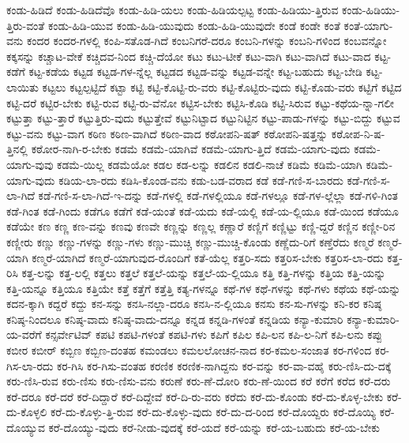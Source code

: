 {ಕಂಡು-ಹಿಡಿದೆ
ಕಂಡು-ಹಿಡಿದೆವೊ
ಕಂಡು-ಹಿಡಿ-ಯಲು
ಕಂಡು-ಹಿಡಿಯಲ್ಪಟ್ಟ
ಕಂಡು-ಹಿಡಿಯು-ತ್ತಿರುವ
ಕಂಡು-ಹಿಡಿಯು-ತ್ತಿರು-ವಂತೆ
ಕಂಡು-ಹಿಡಿ-ಯುವ
ಕಂಡು-ಹಿಡಿ-ಯುವುದು
ಕಂಡು-ಹಿಡಿ-ಯುವುದೇ
ಕಂಡೆ
ಕಂಡೇ
ಕಂತೆ
ಕಂತೆ-ಯಾಗು-ವನು
ಕಂದರ
ಕಂದರ-ಗಳಲ್ಲಿ
ಕಂಪಿ-ಸತೊಡ-ಗಿದೆ
ಕಂಬನಿಗರೆ-ದರೂ
ಕಂಬನಿ-ಗಳನ್ನು
ಕಂಬನಿ-ಗಳಿಂದ
ಕಂಬವನ್ನೋ
ಕಕ್ಕಸನ್ನು
ಕಚ್ಚಾಟ-ವೇಕೆ
ಕಚ್ಚಿದವ-ನಿಂದ
ಕಚ್ಚಿ-ದೆಯೋ
ಕಟು
ಕಟು-ಟೀಕೆ
ಕಟು-ವಾಗಿ
ಕಟು-ವಾಗಿದೆ
ಕಟು-ವಾದ
ಕಟ್ಟ-ಕಡೆಗೆ
ಕಟ್ಟ-ಕಡೆಯ
ಕಟ್ಟಡ
ಕಟ್ಟಡ-ಗಳ-ನ್ನೆಲ್ಲ
ಕಟ್ಟಡದ
ಕಟ್ಟಡ-ವನ್ನು
ಕಟ್ಟಡ-ವನ್ನೇ
ಕಟ್ಟ-ಬಹುದು
ಕಟ್ಟ-ಬೇಡಿ
ಕಟ್ಟ-ಲಾಯಿತು
ಕಟ್ಟಲು
ಕಟ್ಟಲ್ಪಟ್ಟಿದೆ
ಕಟ್ಟಾ
ಕಟ್ಟಿ
ಕಟ್ಟಿ-ಕೊಟ್ಟಿ-ರು-ವರು
ಕಟ್ಟಿ-ಕೊಟ್ಟಿರು-ವುದು
ಕಟ್ಟಿ-ಕೊಡು-ವರು
ಕಟ್ಟಿಗೆ
ಕಟ್ಟಿದ
ಕಟ್ಟಿ-ದರೆ
ಕಟ್ಟಿರ-ಬೇಕು
ಕಟ್ಟಿ-ರುವ
ಕಟ್ಟಿ-ರು-ವೆನೋ
ಕಟ್ಟಿಸ-ಬೇಕು
ಕಟ್ಟಿಸಿ-ಕೊಡಿ
ಕಟ್ಟಿ-ಸಿರುವ
ಕಟ್ಟು-ಕಥೆಯ-ನ್ನಾ-ಗಲೀ
ಕಟ್ಟುತ್ತಾ
ಕಟ್ಟು-ತ್ತಾರೆ
ಕಟ್ಟುತ್ತಿರು-ವುದು
ಕಟ್ಟುತ್ತೇವೆ
ಕಟ್ಟುನಿಟ್ಟಾದ
ಕಟ್ಟುನಿಟ್ಟಿನ
ಕಟ್ಟು-ಪಾಡು-ಗಳನ್ನು
ಕಟ್ಟು-ಬಿದ್ದು
ಕಟ್ಟುವ
ಕಟ್ಟು-ವನು
ಕಟ್ಟು-ವಾಗ
ಕಠಿಣ
ಕಠಿಣ-ವಾಗಿದೆ
ಕಠಿಣ-ವಾದ
ಕಠೋಪನಿ-ಷತ್
ಕಠೋಪನಿ-ಷತ್ತನ್ನು
ಕಠೋಪ-ನಿ-ಷ-ತ್ತಿನಲ್ಲಿ
ಕಠೋರ-ನಾಗಿ-ರ-ಬೇಕು
ಕಡಮೆ
ಕಡಮೆ-ಯಾಗಿವೆ
ಕಡಮೆ-ಯಾಗು-ತ್ತಿದೆ
ಕಡಮೆ-ಯಾಗು-ವುದು
ಕಡಮೆ-ಯಾಗು-ವುವು
ಕಡಮೆ-ಯಿಲ್ಲ
ಕಡಮೆಯೋ
ಕಡಲ
ಕಡ-ಲನ್ನು
ಕಡಲಿನ
ಕಡಲಿ-ನಾಚೆ
ಕಡಿಮೆ
ಕಡಿಮೆ-ಯಾಗಿ
ಕಡಿಮೆ-ಯಾಗು-ವುದು
ಕಡಿಯ-ಲಾ-ರದು
ಕಡಿಸಿ-ಕೊಂಡ-ವನು
ಕಡು-ಬಡ-ವರಾದ
ಕಡೆ
ಕಡೆ-ಗಣಿ-ಸ-ಬಾರದು
ಕಡೆ-ಗಣಿ-ಸ-ಲಾ-ಗಿದೆ
ಕಡೆ-ಗಣಿ-ಸ-ಲಾ-ಗಿದೆ-ಇ-ದನ್ನು
ಕಡೆ-ಗಳಲ್ಲಿ
ಕಡೆ-ಗಳಲ್ಲಿಯೂ
ಕಡೆ-ಗಳಲ್ಲೂ
ಕಡೆ-ಗಳ-ಲ್ಲೆಲ್ಲಾ
ಕಡೆ-ಗಳಿ-ಗಿಂತ
ಕಡೆ-ಗಿಂತ
ಕಡೆ-ಗಿಂದು
ಕಡೆಗೂ
ಕಡೆಗೆ
ಕಡೆ-ಯಂತೆ
ಕಡೆ-ಯದು
ಕಡೆ-ಯಲ್ಲಿ
ಕಡೆ-ಯ-ಲ್ಲಿಯೂ
ಕಡೆ-ಯಿಂದ
ಕಡೆಯೂ
ಕಡೆಯೇ
ಕಣ
ಕಣ್ಣ
ಕಣ-ವನ್ನು
ಕಣವು
ಕಣವೇ
ಕಣ್ಣನ್ನು
ಕಣ್ಣಲ್ಲ
ಕಣ್ಣಾರೆ
ಕಣ್ಣಿಗೆ
ಕಣ್ಣಿಟ್ಟು
ಕಣ್ಣಿ-ದ್ದರೆ
ಕಣ್ಣಿನ
ಕಣ್ಣೀ-ರಿನ
ಕಣ್ಣೀರು
ಕಣ್ಣು
ಕಣ್ಣು-ಗಳನ್ನು
ಕಣ್ಣು-ಗಳು
ಕಣ್ಣು-ಮುಚ್ಚಿ
ಕಣ್ಣು-ಮುಚ್ಚಿ-ಕೊಂಡು
ಕಣ್ಣೆದು-ರಿಗೆ
ಕಣ್ತೆರೆದು
ಕಣ್ಮರೆ
ಕಣ್ಮರೆ-ಯಾಗಿ
ಕಣ್ಮರೆ-ಯಾಗಿದೆ
ಕಣ್ಮರೆ-ಯಾಗುವುದ-ರೊಂದಿಗೆ
ಕತೆ-ಯೆಲ್ಲ
ಕತ್ತರಿ-ಸದು
ಕತ್ತರಿಸ-ಬೇಕು
ಕತ್ತರಿಸ-ಲಾ-ರದು
ಕತ್ತ-ರಿಸಿ
ಕತ್ತ-ಲನ್ನು
ಕತ್ತ-ಲಲ್ಲಿ
ಕತ್ತಲು
ಕತ್ತಲೆ
ಕತ್ತಲೆ-ಯನ್ನು
ಕತ್ತಲೆ-ಯ-ಲ್ಲಿಯೂ
ಕತ್ತಿ
ಕತ್ತಿ-ಗಳನ್ನು
ಕತ್ತಿಯ
ಕತ್ತಿ-ಯನ್ನು
ಕತ್ತಿ-ಯನ್ನೂ
ಕತ್ತಿಯೂ
ಕತ್ತಿಯೇ
ಕತ್ತೆ
ಕತ್ತೆಗೆ
ಕತ್ತೆತ್ತಿ
ಕತ್ಯ-ಗಳನ್ನೂ
ಕಥೆ-ಗಳ
ಕಥೆ-ಗಳನ್ನು
ಕಥೆ-ಗಳು
ಕಥೆಯ
ಕಥೆ-ಯನ್ನು
ಕದನ-ಕ್ಕಾಗಿ
ಕದ್ದರೆ
ಕದ್ದು
ಕನ-ಸನ್ನು
ಕನಸಿ-ನಲ್ಲಾ-ದರೂ
ಕನಸಿ-ನ-ಲ್ಲಿಯೂ
ಕನಸು
ಕನ-ಸು-ಗಳನ್ನು
ಕನಿ-ಕರ
ಕನಿಷ್ಠ
ಕನಿಷ್ಠ-ನಿಂದಲೂ
ಕನಿಷ್ಠ-ವಾದು
ಕನಿಷ್ಠ-ವಾದು-ದನ್ನೂ
ಕನ್ನಡ
ಕನ್ನಡಿ-ಗಳಂತೆ
ಕನ್ನಡಿಯ
ಕನ್ಯಾ-ಕುಮಾರಿ
ಕನ್ಯಾ-ಕುಮಾರಿ-ಯ-ವರೆಗೆ
ಕನ್ಸರ್ವೇಟಿವ್
ಕಪಟಿ
ಕಪಟಿ-ಗಳಂತೆ
ಕಪಟಿ-ಗಳು
ಕಪಿಗೆ
ಕಪಿಲ
ಕಪಿ-ಲನ
ಕಪಿ-ಲ-ನಿಗೆ
ಕಪಿ-ಲನು
ಕಪ್ಪು
ಕಬೀರ
ಕಬೀರ್
ಕಬ್ಬಿಣ
ಕಬ್ಬಿಣ-ದಂತಹ
ಕಮಂಡಲು
ಕಮಲಲೋಚನ-ನಾದ
ಕರ-ಕಮಲ-ಸಂಜಾತ
ಕರ-ಗಳಿಂದ
ಕರ-ಗಿಸ-ಲಾ-ರದು
ಕರ-ಗಿಸಿ
ಕರ-ಗಿಸು-ವಂತಹ
ಕರಣಿಕ
ಕರಣಿಕ-ನಾಗಿದ್ದನು
ಕರ-ವನ್ನು
ಕರ-ವಾ-ವಹೈ
ಕರು-ಣಿಸಿ-ದು-ದಕ್ಕೆ
ಕರು-ಣಿಸಿ-ರುವ
ಕರು-ಣಿಸು
ಕರು-ಣಿಸು-ವನು
ಕರುಣೆ
ಕರು-ಣೆ-ದೋರಿ
ಕರು-ಣೆ-ಯಿಂದ
ಕರೆ
ಕರೆಗೆ
ಕರೆದ
ಕರೆ-ದರು
ಕರೆ-ದರೂ
ಕರೆ-ದರೆ
ಕರೆ-ದಿದ್ದಾರೆ
ಕರೆ-ದಿದ್ದೇವೆ
ಕರೆ-ದಿ-ರು-ವರು
ಕರೆದು
ಕರೆ-ದು-ಕೊಂಡು
ಕರೆ-ದು-ಕೊಳ್ಳ-ಬೇಕು
ಕರೆ-ದು-ಕೊಳ್ಳಲಿ
ಕರೆ-ದು-ಕೊಳ್ಳು-ತ್ತಿ-ರುವ
ಕರೆ-ದು-ಕೊಳ್ಳು-ವುದು
ಕರೆ-ದು-ದ-ರಿಂದ
ಕರೆ-ದೊಯ್ದರು
ಕರೆ-ದೊಯ್ಯಿ
ಕರೆ-ದೊಯ್ಯುವ
ಕರೆ-ದೊಯ್ಯು-ವುದು
ಕರೆ-ನೀಡು-ವುದಕ್ಕೆ
ಕರೆ-ಯದೆ
ಕರೆ-ಯನ್ನು
ಕರೆ-ಯ-ಬಹುದು
ಕರೆ-ಯ-ಬೇಕು
}
